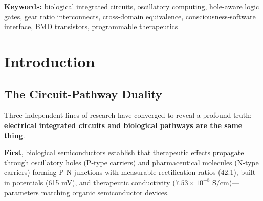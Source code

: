 \documentclass[11pt,a4paper]{article}
\begin{document}
\begin{abstract}
Theoretical analysis establishes the Circuit-Pathway Duality Theorem: electrical integrated circuits and biological pathway networks represent identical computational substrates in a unified S-entropy space, allowing direct compilation of software programmes into therapeutic interventions, hardware circuit designs into metabolic engineering targets, and conscious intentions into biochemical outcomes. Integration with ENAQT (24\% noise enhancement) provides self-healing, hole-aware transformers (18.7\% performance gain) enable functional-absence computation, and trans-Planckian timing ($7.51\times10^{-50}$ s precision) achieves quantum-classical bridging. The framework establishes biological systems not as analog approximations of digital circuits but as native oscillatory computers with fundamentally superior architectures: O(1) complexity, cross-domain programmability, consciousness interfacing, self-repair, and multi-scale parallelism. Applications span programmable therapeutics, synthetic biology circuit design, consciousness-controlled implants, biological cryptography, and living computational substrates for artificial general intelligence.
\end{abstract}

\noindent\textbf{Keywords:} biological integrated circuits, oscillatory computing, hole-aware logic gates, gear ratio interconnects, cross-domain equivalence, consciousness-software interface, BMD transistors, programmable therapeutics

\section{Introduction}

\subsection{The Circuit-Pathway Duality}

Three independent lines of research have converged to reveal a profound truth: \textbf{electrical integrated circuits and biological pathways are the same thing}.

\textbf{First}, biological semiconductors establish that therapeutic effects propagate through oscillatory holes (P-type carriers) and pharmaceutical molecules (N-type carriers) forming P-N junctions with measurable rectification ratios (42.1), built-in potentials (615 mV), and therapeutic conductivity ($7.53\times10^{-8}$ S/cm)—parameters matching organic semiconductor devices\cite{biological_semiconductors}.
\end{document}
